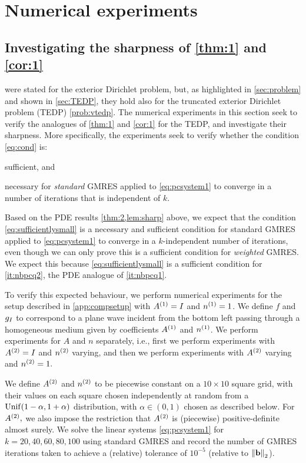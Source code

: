 \section{Numerical experiments}\label{sec:num}
\subsection{Investigating the sharpness of \cref{thm:1} and \cref{cor:1}}

 were stated for the exterior Dirichlet problem, but, as highlighted in \cref{sec:problem} and shown in \cref{sec:TEDP}, they hold also for the truncated exterior Dirichlet problem (TEDP) \cref{prob:vtedp}. The numerical experiments in this section seek to verify the analogues of \cref{thm:1} and \cref{cor:1} for the TEDP, and investigate their sharpness. More specifically, the experiments seek to verify whether the condition \cref{eq:cond} is:
\ben
\item sufficient, and
\item necessary
  \een
  for \emph{standard} GMRES applied to \cref{eq:pcsystem1} to converge in a number of iterations that is independent of $k.$

Based on the PDE results \cref{thm:2,lem:sharp} above, we expect that the condition \cref{eq:sufficientlysmall} is a necessary and sufficient condition for standard GMRES applied to \cref{eq:pcsystem1} to converge in a $k$-independent number of iterations, even though we can only prove this is a sufficient condition for \emph{weighted} GMRES. We expect this because \cref{eq:sufficientlysmall} is a sufficient condition for \cref{it:nbpcq2}, the PDE analogue of \cref{it:nbpcq1}.

To verify this expected behaviour, we perform numerical experiments for the setup described in \cref{app:compsetup} with ${A}^{(1)} = I$ and ${n}^{(1)} = 1$. We define $f$ and $g_{I}$ to correspond to a plane wave incident from the bottom left passing through a homogeneous medium given by coefficients ${A}^{(1)}$ and ${n}^{(1)}$. We perform experiments for $A$ and $n$ separately, i.e., first we perform experiments with ${A}^{(2)}=I$ and ${n}^{(2)}$ varying, and then we perform experiments with ${A}^{(2)}$ varying and ${n}^{(2)}=1.$

We define ${A}^{(2)}$ and ${n}^{(2)}$ to be piecewise constant on a $10\times10$ square grid, with their values on each square chosen independently at random from a $\Unif\mleft(1-\alpha,1+\alpha\mright)$ distribution, with $\alpha \in (0,1)$ chosen as described below. For ${A}^{(2)},$ we also impose the restriction that ${A}^{(2)}$ is (piecewise) positive-definite almost surely. We solve the linear systems \cref{eq:pcsystem1} for $k = 20,40,60,80,100$ using standard GMRES and record the number of GMRES iterations taken to achieve a (relative) tolerance of $10^{-5}$ (relative to $\Nt{\bfb}$).


